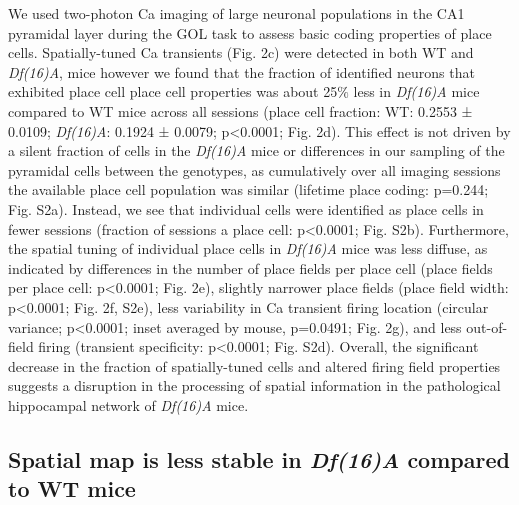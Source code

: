 We used two-photon Ca imaging of large neuronal populations in the CA1 pyramidal layer during the GOL task to assess basic coding properties of place cells. Spatially-tuned Ca transients \citep{Dombeck2007} (Fig. 2c) were detected in both WT and \emph{Df(16)A\super{+/-}}, mice however we found that the fraction of identified neurons that exhibited place cell place cell properties was about 25$\%$ less in \emph{Df(16)A\super{+/-}} mice compared to WT mice across all sessions (place cell fraction: WT: 0.2553 ± 0.0109; \emph{Df(16)A\super{+/-}}: 0.1924 ± 0.0079; p<0.0001; Fig. 2d).  This effect is not driven by a silent fraction of cells in the \emph{Df(16)A\super{+/-}} mice or differences in our sampling of the pyramidal cells between the genotypes, as cumulatively over all imaging sessions the available place cell population was similar (lifetime place coding: p=0.244; Fig. S2a). Instead, we see that individual cells were identified as place cells in fewer sessions (fraction of sessions a place cell: p<0.0001; Fig. S2b). Furthermore, the spatial tuning of individual place cells in \emph{Df(16)A\super{+/-}} mice was less diffuse, as indicated by differences in the number of place fields per place cell (place fields per place cell: p<0.0001; Fig. 2e), slightly narrower place fields (place field width: p<0.0001; Fig. 2f, S2e), less variability in Ca transient firing location (circular variance; p<0.0001; inset averaged by mouse, p=0.0491; Fig. 2g), and less out-of-field firing (transient specificity: p<0.0001; Fig. S2d).  Overall, the significant decrease in the fraction of spatially-tuned cells and altered firing field properties suggests a disruption in the processing of spatial information in the pathological hippocampal network of \emph{Df(16)A\super{+/-}} mice.

\subsection{Spatial map is less stable in \emph{Df(16)A\super{+/-}} compared to WT mice}

